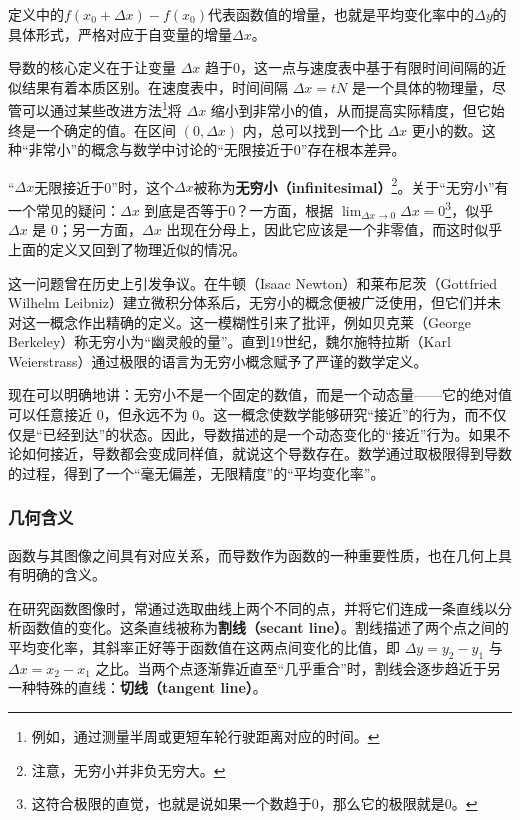 定义中的$f(x_0+\Delta x)-f(x_0)$代表函数值的增量，也就是平均变化率中的$\Delta y$的具体形式，严格对应于自变量的增量$\Delta x$。

导数的核心定义在于让变量 $\Delta x$ 趋于0，这一点与速度表中基于有限时间间隔的近似结果有着本质区别。在速度表中，时间间隔 $\Delta x = tN$ 是一个具体的物理量，尽管可以通过某些改进方法\footnote{例如，通过测量半周或更短车轮行驶距离对应的时间。}将 $\Delta x$ 缩小到非常小的值，从而提高实际精度，但它始终是一个确定的值。在区间 $(0, \Delta x)$ 内，总可以找到一个比 $\Delta x$ 更小的数。这种“非常小”的概念与数学中讨论的“无限接近于0”存在根本差异。

“$\Delta x$无限接近于0”时，这个$\Delta x$被称为\textbf{无穷小（infinitesimal）}\footnote{注意，无穷小并非负无穷大。}。关于“无穷小”有一个常见的疑问：$\Delta x$ 到底是否等于0？一方面，根据 $\displaystyle\lim_{\Delta x \to 0} \Delta x = 0$\footnote{这符合极限的直觉，也就是说如果一个数趋于0，那么它的极限就是0。}，似乎 $\Delta x$ 是 0；另一方面，$\Delta x$ 出现在分母上，因此它应该是一个非零值，而这时似乎上面的定义又回到了物理近似的情况。

这一问题曾在历史上引发争议。在牛顿（Isaac Newton）和莱布尼茨（Gottfried Wilhelm Leibniz）建立微积分体系后，无穷小的概念便被广泛使用，但它们并未对这一概念作出精确的定义。这一模糊性引来了批评，例如贝克莱（George Berkeley）称无穷小为“幽灵般的量”。直到19世纪，魏尔施特拉斯（Karl Weierstrass）通过极限的语言为无穷小概念赋予了严谨的数学定义。

现在可以明确地讲：无穷小不是一个固定的数值，而是一个动态量——它的绝对值可以任意接近 0，但永远不为 0。这一概念使数学能够研究“接近”的行为，而不仅仅是“已经到达”的状态。因此，导数描述的是一个动态变化的“接近”行为。如果不论如何接近，导数都会变成同样值，就说这个导数存在。数学通过取极限得到导数的过程，得到了一个“毫无偏差，无限精度”的“平均变化率”。

\subsubsection{几何含义}

函数与其图像之间具有对应关系，而导数作为函数的一种重要性质，也在几何上具有明确的含义。

在研究函数图像时，常通过选取曲线上两个不同的点，并将它们连成一条直线以分析函数值的变化。这条直线被称为\textbf{割线（secant line）}。割线描述了两个点之间的平均变化率，其斜率正好等于函数值在这两点间变化的比值，即 $\Delta y = y_2 - y_1$ 与 $\Delta x = x_2 - x_1$ 之比。当两个点逐渐靠近直至“几乎重合”时，割线会逐步趋近于另一种特殊的直线：\textbf{切线（tangent line）}。

